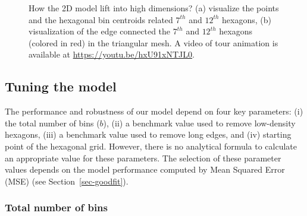 \documentclass[
  12pt]{article}
\begin{document}
\begin{figure}


\caption{\label{fig-wkhighD}How the 2D model lift into high dimensions?
(a) visualize the points and the hexagonal bin centroids related
\(7^{th}\) and \(12^{th}\) hexagons, (b) visualization of the edge
connected the \(7^{th}\) and \(12^{th}\) hexagons (colored in red) in
the triangular mesh. A video of tour animation is available at
\url{https://youtu.be/hxU91xNTJL0}.}

\end{figure}%

\subsection{Tuning the model}\label{tuning-the-model}

The performance and robustness of our model depend on four key
parameters: (i) the total number of bins (\(b\)), (ii) a benchmark value
used to remove low-density hexagons, (iii) a benchmark value used to
remove long edges, and (iv) starting point of the hexagonal grid.
However, there is no analytical formula to calculate an appropriate
value for these parameters. The selection of these parameter values
depends on the model performance computed by Mean Squared Error (MSE)
(see Section~\ref{sec-goodfit}).

\subsubsection{Total number of bins}\label{total-number-of-bins}
\end{document}

